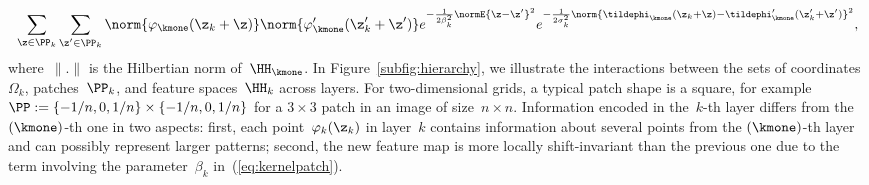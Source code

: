 \vspace*{-0.1cm}
\begin{equation}
   \sum_{\z \in \PP_k} \sum_{\z' \in \PP_k} \norm{\varphi_{\kmone}(\z_k+\z)}  \norm{\varphi_{\kmone}'(\z'_k + \z')} e^{-\frac{1}{2\beta_k^2}\normE{\z-\z'}^2} e^{-\frac{1}{2\sigma_k^2} \norm{\tildephi_{\kmone}(\z_k+\z)-\tildephi_{\kmone}'(\z_k'+\z')}^2}, \label{eq:kernelpatch}
\vspace*{-0.00cm}
\end{equation}
where~$\|.\|$ is the Hilbertian norm of~$\HH_{\kmone}$.
In Figure~\ref{subfig:hierarchy}, we illustrate the interactions
between the sets of coordinates~$\Omega_k$, patches~$\PP_k$, and feature spaces~$\HH_k$ across
layers. For two-dimensional grids, a typical patch
shape is a square, for example~$\PP := \{-1/n,0,1/n\} \times \{-1/n,0,1/n\}$ for a $3
\times 3$ patch in an image of size~$n \times n$. Information encoded in the~$k$-th layer differs from the~$(\kmone)$-th one in two aspects:
first, each point~$\varphi_k(\z_k)$ in layer~$k$ contains
information about several points from the $(\kmone)$-th layer and can possibly represent
larger patterns; second, the new feature map is more locally shift-invariant than the previous one due to the
term involving the parameter~$\beta_k$ in~(\ref{eq:kernelpatch}). 

